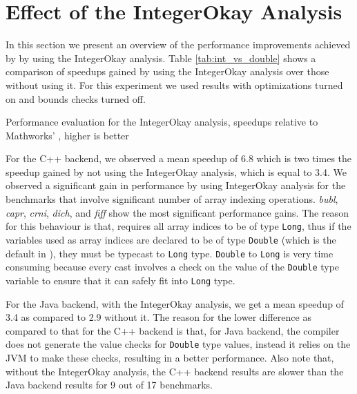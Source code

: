 \section{Effect of the IntegerOkay Analysis}    
\label{sec:intok_perf}

In this section we present an overview of the performance improvements
achieved by \mixten by using the IntegerOkay analysis. Table \ref{tab:int_vs_double}
shows a comparison of speedups gained by using the IntegerOkay analysis over
those without using it. For this experiment we used results with \xten
optimizations turned on and bounds checks turned off. 
   
\begin{table}[htbp]
\begin{center} 
\begin{footnotesize}

\end{footnotesize}
\caption{Performance evaluation for the IntegerOkay
analysis, speedups relative to Mathworks' \matlab, higher is better} 
\label{tab:int_vs_double} 
\end{center} 
\end{table}

For the C++ backend, we observed a mean speedup of 6.8 which is two
times the speedup gained by not using the IntegerOkay analysis, which is equal
to 3.4. We observed a significant gain in performance by using IntegerOkay
analysis for the benchmarks that involve significant number of array indexing
operations. \emph{bubl}, \emph{capr}, \emph{crni}, \emph{dich}, and \emph{fiff} 
show the most significant performance gains. The reason for this
behaviour is that, \xten requires all array indices to be of type \texttt{Long},
thus if the variables used as array indices are declared to be of type
\texttt{Double} (which is the default in \matlab), they must be typecast to
\texttt{Long} type. \texttt{Double} to \texttt{Long} is very time consuming
because every cast involves a check on the value of the \texttt{Double} type
variable to ensure that it can safely fit into \texttt{Long} type. 

For the Java backend, with the IntegerOkay analysis, we get a mean speedup of
3.4 as compared to 2.9 without it. The reason for the lower difference as
compared to that for the C++ backend is that, for Java backend, the \xten
compiler does not generate the value checks for \texttt{Double} type values,
instead it relies on the JVM to make  these checks, resulting in a better
performance.  Also note that, without the IntegerOkay analysis, the C++ backend
results are slower than the Java backend results for 9 out of 17 benchmarks.


